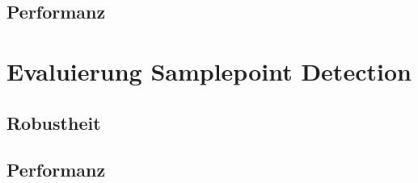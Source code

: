     \subsection{Performanz}
    \label{subsec:subimage_performanz}

\section{Evaluierung Samplepoint Detection}
\label{sec:evaluierung_samplepoint}

    \subsection{Robustheit}
    \label{subsec:samplepoint_robustheit}    

    \subsection{Performanz}
    \label{subsec:samplepoint_performanz}
